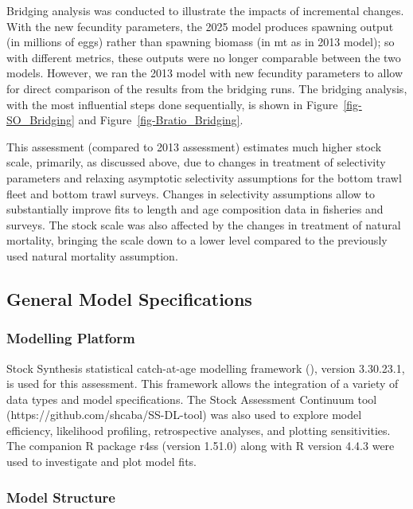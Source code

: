 \documentclass[
]{scrartcl}
\begin{document}
Bridging analysis was conducted to illustrate the impacts of incremental
changes. With the new fecundity parameters, the 2025 model produces
spawning output (in millions of eggs) rather than spawning biomass (in
mt as in 2013 model); so with different metrics, these outputs were no
longer comparable between the two models. However, we ran the 2013 model
with new fecundity parameters to allow for direct comparison of the
results from the bridging runs. The bridging analysis, with the most
influential steps done sequentially, is shown in
Figure~\ref{fig-SO_Bridging} and Figure~\ref{fig-Bratio_Bridging}.

This assessment (compared to 2013 assessment) estimates much higher
stock scale, primarily, as discussed above, due to changes in treatment
of selectivity parameters and relaxing asymptotic selectivity
assumptions for the bottom trawl fleet and bottom trawl surveys. Changes
in selectivity assumptions allow to substantially improve fits to length
and age composition data in fisheries and surveys. The stock scale was
also affected by the changes in treatment of natural mortality, bringing
the scale down to a lower level compared to the previously used natural
mortality assumption.

\subsection{General Model
Specifications}\label{general-model-specifications}

\subsubsection{Modelling Platform}\label{modelling-platform}

Stock Synthesis statistical catch-at-age modelling framework
(), version
3.30.23.1, is used for this assessment. This framework allows the
integration of a variety of data types and model specifications. The
Stock Assessment Continuum tool (https://github.com/shcaba/SS-DL-tool)
was also used to explore model efficiency, likelihood profiling,
retrospective analyses, and plotting sensitivities. The companion R
package r4ss (version 1.51.0) along with R version 4.4.3 were used to
investigate and plot model fits.

\subsubsection{Model Structure}\label{model-structure}
\end{document}
